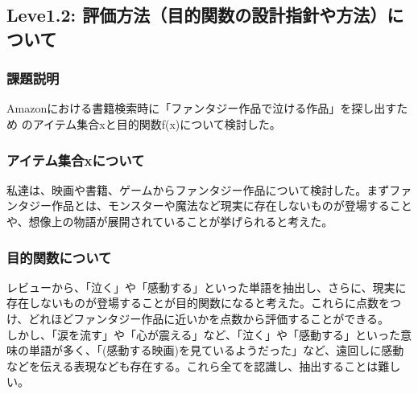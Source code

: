 \subsection{Leve1.2: 評価方法（目的関数の設計指針や方法）について}
\subsubsection{課題説明}
Amazonにおける書籍検索時に「ファンタジー作品で泣ける作品」を探し出すため
のアイテム集合xと目的関数f(x)について検討した。

\subsubsection{アイテム集合xについて}
私達は、映画や書籍、ゲームからファンタジー作品について検討した。まずファンタジー作品とは、モンスターや魔法など現実に存在しないものが登場することや、想像上の物語が展開されていることが挙げられると考えた。

\subsubsection{目的関数について}
レビューから、「泣く」や「感動する」といった単語を抽出し、さらに、現実に存在しないものが登場することが目的関数になると考えた。これらに点数をつけ、どれほどファンタジー作品に近いかを点数から評価することができる。\\
しかし、「涙を流す」や「心が震える」など、「泣く」や「感動する」といった意味の単語が多く、「(感動する映画)を見ているようだった」など、遠回しに感動などを伝える表現なども存在する。これら全てを認識し、抽出することは難しい。



